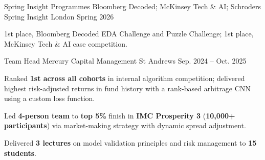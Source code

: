 \begin{cventries}
  \cventry
    {Spring Insight Programmes} %
    {Bloomberg Decoded; McKinsey Tech \& AI; Schroders Spring Insight} %
    {London} %
    {Spring 2026} %
    {
      \begin{cvitems}
        \item {1st place, Bloomberg Decoded EDA Challenge and Puzzle Challenge; 1st place, McKinsey Tech \& AI case competition.}
      \end{cvitems}
    }

  \cventry
    {Team Head} %
    {Mercury Capital Management} %
    {St Andrews} %
    {Sep. 2024 -- Oct. 2025} %
    {
      \begin{cvitems}
        \item {Ranked \textbf{1st across all cohorts} in internal algorithm competition; delivered highest risk-adjusted returns in fund history with a rank-based arbitrage CNN using a custom loss function.}
        \item {Led \textbf{4-person team} to \textbf{top 5\%} finish in \textbf{IMC Prosperity 3} (\textbf{10,000+ participants}) via market-making strategy with dynamic spread adjustment.}
        \item {Delivered \textbf{3 lectures} on model validation principles and risk management to \textbf{15 students}.}
      \end{cvitems}
    }

\end{cventries}
